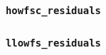 \subsubsection{\texttt{howfsc\_residuals}}
\label{sec:esc-dynamic-howfsc-residuals}


\subsubsection{\texttt{llowfs\_residuals}}
\label{sec:esc-dynamic-llowfs-residuals}
